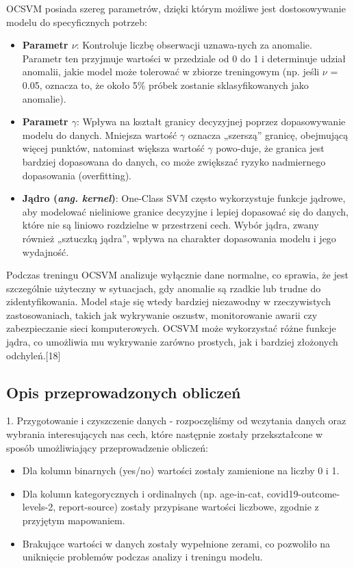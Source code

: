 \documentclass[a4paper,fleqn]{cas-dc}
\begin{document}
\par OCSVM posiada szereg parametrów, dzięki którym możliwe jest dostosowywanie modelu do specyficznych potrzeb:

\begin{itemize}
    \item \textbf{Parametr $\nu$}: Kontroluje liczbę obserwacji uznawa-nych za anomalie. Parametr ten przyjmuje wartości w przedziale od 0 do 1 i determinuje udział anomalii, jakie model może tolerować w zbiorze treningowym (np. jeśli $\nu$ = 0.05, oznacza to, że około 5\% próbek zostanie sklasyfikowanych jako anomalie).
    \item \textbf{Parametr $\gamma$}: Wpływa na kształt granicy decyzyjnej poprzez dopasowywanie modelu do danych. Mniejsza wartość $\gamma$ oznacza „szerszą” granicę, obejmującą więcej punktów, natomiast większa wartość $\gamma$ powo-duje, że granica jest bardziej dopasowana do danych, co może zwiększać ryzyko nadmiernego dopasowania (overfitting).
    \item \textbf{Jądro (\textit{ang. kernel})}: One-Class SVM często wykorzystuje funkcje jądrowe, aby modelować nieliniowe granice decyzyjne i lepiej dopasować się do danych, które nie są liniowo rozdzielne w przestrzeni cech. Wybór jądra, zwany również „sztuczką jądra”, \break wpływa na charakter dopasowania modelu i jego wydajność.
\end{itemize}

Podczas treningu OCSVM analizuje wyłącznie dane normalne, co sprawia, że jest szczególnie użyteczny w sytuacjach, gdy anomalie są rzadkie lub trudne do zidentyfikowania. Model staje się wtedy bardziej niezawodny w rzeczywistych zastosowaniach, takich jak wykrywanie oszustw, monitorowanie awarii czy zabezpieczanie sieci komputerowych. OCSVM może wykorzystać różne funkcje jądra, co umożliwia mu wykrywanie zarówno prostych, jak i bardziej złożonych odchyleń.[18]

\subsection{Opis przeprowadzonych obliczeń}

1. Przygotowanie i czyszczenie danych - rozpoczęliśmy od wczytania danych oraz wybrania interesujących nas cech, które następnie zostały przekształcone w sposób umożliwiający przeprowadzenie obliczeń:
\begin{itemize} 
\item Dla kolumn binarnych (yes/no) wartości zostały zamienione na liczby 0 i 1.
\item  Dla kolumn kategorycznych i ordinalnych (np. age-in-cat, covid19-outcome-levels-2, report-source) zostały przypisane wartości liczbowe, zgodnie z przyjętym mapowaniem.
 \item Brakujące wartości w danych zostały wypełnione zerami, co pozwoliło na uniknięcie problemów podczas analizy i treningu modelu.
\end{itemize}
\end{document}

